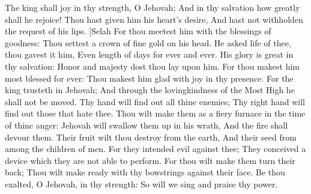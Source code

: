 The king shall joy in thy strength, O Jehovah; And in thy salvation how greatly shall he rejoice!  Thou hast given him his heart’s desire, And hast not withholden the request of his lips. [Selah  For thou meetest him with the blessings of goodness: Thou settest a crown of fine gold on his head.  He asked life of thee, thou gavest it him, Even length of days for ever and ever.  His glory is great in thy salvation: Honor and majesty dost thou lay upon him.  For thou makest him most blessed for ever: Thou makest him glad with joy in thy presence.  For the king trusteth in Jehovah; And through the lovingkindness of the Most High he shall not be moved.  Thy hand will find out all thine enemies; Thy right hand will find out those that hate thee.  Thou wilt make them as a fiery furnace in the time of thine anger: Jehovah will swallow them up in his wrath, And the fire shall devour them.  Their fruit wilt thou destroy from the earth, And their seed from among the children of men.  For they intended evil against thee; They conceived a device which they are not able to perform.  For thou wilt make them turn their back; Thou wilt make ready with thy bowstrings against their face.  Be thou exalted, O Jehovah, in thy strength: So will we sing and praise thy power. 

